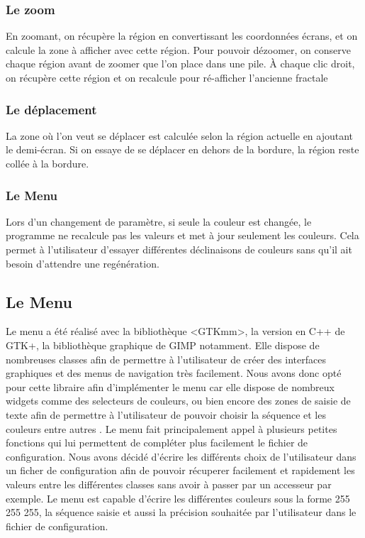 \documentclass{article}
\begin{document}
	\subsubsection{Le zoom}

	En zoomant, on récupère la région en convertissant les coordonnées écrans, et on calcule la zone à afficher avec cette région.
	Pour pouvoir dézoomer, on conserve chaque région avant de zoomer que l'on place dans une pile.
	À chaque clic droit, on récupère cette région et on recalcule pour ré-afficher l'ancienne fractale

	\subsubsection{Le déplacement}

	La zone où l'on veut se déplacer est calculée selon la région actuelle en ajoutant le demi-écran.
	Si on essaye de se déplacer en dehors de la bordure, la région reste collée à la bordure.

	\subsubsection{Le Menu}

	Lors d'un changement de paramètre, si seule la couleur est changée, le programme ne recalcule pas les valeurs et met à jour seulement les couleurs.
	Cela permet à l'utilisateur d'essayer différentes déclinaisons de couleurs sans qu'il ait besoin d'attendre une regénération.

	\subsection{Le Menu}
	Le menu a été réalisé avec la bibliothèque <GTKmm>, la version en C++ de GTK+, la bibliothèque graphique de GIMP notamment.
	Elle dispose de nombreuses classes afin de permettre à l'utilisateur de créer des interfaces graphiques et des menus de navigation très facilement.
	Nous avons donc opté pour cette libraire afin d'implémenter le menu car elle dispose de nombreux widgets comme des selecteurs de couleurs, ou bien encore des zones de saisie de texte afin de permettre à l'utilisateur de pouvoir choisir la séquence et les couleurs entre autres .
	Le menu fait principalement appel à plusieurs petites fonctions qui lui permettent de compléter plus facilement le fichier de configuration.
	Nous avons décidé d'écrire les différents choix de l'utilisateur dans un ficher de configuration afin de pouvoir récuperer facilement et rapidement les valeurs entre les différentes classes sans avoir à passer par un accesseur par exemple.
	Le menu est capable d'écrire les différentes couleurs sous la forme 255 255 255, la séquence saisie et aussi la précision souhaitée par l'utilisateur dans le fichier de configuration.
\end{document}
